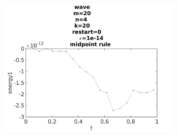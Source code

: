 \begin{figure}[H]
\begin{subfigure}[b]{0.30\textwidth}
                \includegraphics[width=\textwidth]{../MATLAB/fig/energyovertimemidpoint.jpg}
                \caption{  }
                \label{fig:energyovertimemidpoint}
        \end{subfigure}
        

\end{figure}
